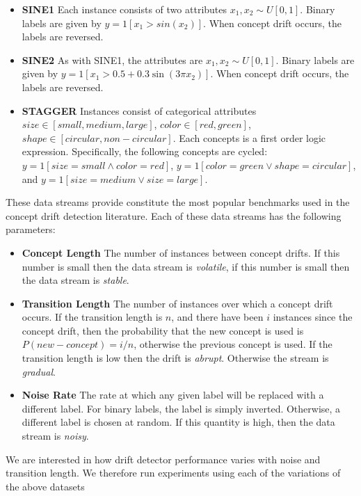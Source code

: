 \begin{itemize}
    \item {\bf SINE1} Each instance consists of two attributes $x_1,x_2\sim U[0,1]$. Binary labels are given by $y = \mathrm{1}[x_1>sin(x_2)]$. When concept drift occurs, the labels are reversed.
    \item {\bf SINE2} As with SINE1, the attributes are $x_1,x_2\sim U[0,1]$. Binary labels are given by $y = \mathrm{1}[x_1>0.5+0.3\sin(3\pi x_2)]$. When concept drift occurs, the labels are reversed.
    \item {\bf STAGGER} Instances consist of categorical attributes $size\in [small, medium, large]$, $color\in [red, green]$, $shape\in [circular, non-circular]$. Each concepts is a first order logic expression. Specifically, the following concepts are cycled: $y=\mathrm{1}[size=small \wedge color=red]$, $y=\mathrm{1}[color=green \vee shape=circular]$, and $y=\mathrm{1}[size=medium \vee size=large]$.
\end{itemize}
These data streams provide constitute the most popular benchmarks used in the concept drift detection literature. Each of these data streams has the following parameters:
\begin{itemize}
    \item {\bf Concept Length} The number of instances between concept drifts. If this number is small then the data stream is {\it volatile}, if this number is small then the data stream is {\it stable}.
    \item {\bf Transition Length} The number of instances over which a concept drift occurs. If the transition length is $n$, and there have been $i$ instances since the concept drift, then the probability that the new concept is used is $P(new-concept)=i/n$, otherwise the previous concept is used. If the transition length is low then the drift is {\it abrupt}. Otherwise the stream is {\it gradual}.
    \item {\bf Noise Rate} The rate at which any given label will be replaced with a different label. For binary labels, the label is simply inverted. Otherwise, a different label is chosen at random. If this quantity is high, then the data stream is {\it noisy}.
\end{itemize}
We are interested in how drift detector performance varies with noise and transition length. We therefore run experiments using each of the variations of the above datasets
